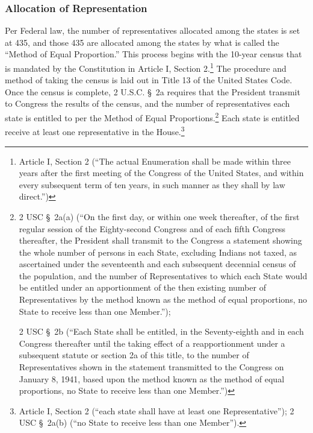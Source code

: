 \subsubsection{Allocation of Representation}
Per Federal law, the number of representatives allocated among the states is set at 435, and those 435 are allocated among the states by what is called the ``Method of Equal Proportion.''  This process begins with the 10-year census that is mandated by the Constitution in Article I, Section 2.\footnote{Article I, Section 2 (``The actual Enumeration shall be made within three years after the first meeting of the Congress of the United States, and within every subsequent term of ten years, in such manner as they shall by law direct.'')}
The procedure and method of taking the census is laid out in Title 13 of the United States Code.  Once the census is complete, 2 U.S.C. \S\ 2a requires that the President transmit to Congress the results of the census, and the number of representatives each state is entitled to per the Method of Equal Proportions.\footnote{2 USC \S\ 2a(a) (``On the first day, or within one week thereafter, of the first regular session of the Eighty-second Congress and of each fifth Congress thereafter, the President shall transmit to the Congress a statement showing the whole number of persons in each State, excluding Indians not taxed, as ascertained under the seventeenth and each subsequent decennial census of the population, and the number of Representatives to which each State would be entitled under an apportionment of the then existing number of Representatives by the method known as the method of equal proportions, no State to receive less than one Member.''); 

2 USC \S\ 2b (``Each State shall be entitled, in the Seventy-eighth and in each Congress thereafter until the taking effect of a reapportionment under a subsequent statute or section 2a of this title, to the number of Representatives shown in the statement transmitted to the Congress on January 8, 1941, based upon the method known as the method of equal proportions, no State to receive less than one Member.'')}
Each state is entitled receive at least one representative in the House.\footnote{Article I, Section 2 (``each state shall have at least one Representative''); 2 USC \S\ 2a(b) (``no State to receive less than one Member'').}

